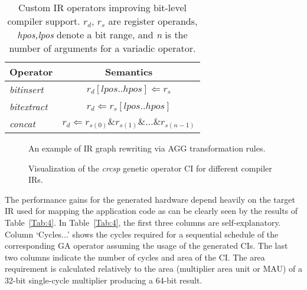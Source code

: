 \documentclass{comjnl}
\begin{document}
\begin{table}
  \renewcommand{\arraystretch}{0.95}
  \caption{Custom IR operators improving bit-level compiler support. $r_{d}$, $r_{s}$ are register operands, {\it hpos,lpos} denote a bit range, and {\it n} is the number of arguments for a variadic operator.} 
  \centering
  {\footnotesize
  \begin{tabular}{|l|c|}
    \hline
    \multicolumn{1}{|m{2.0cm}|}{\centering Operator}
    &\multicolumn{1}{m{5.0cm}|}{\centering Semantics}\\
    \hline
    {\it bitinsert} & $r_{d}[lpos..hpos] \Leftarrow r_{s}$ \\ 
    {\it bitextract} & $r_{d} \Leftarrow r_{s}[lpos..hpos]$ \\ 
    {\it concat} & $r_{d} \Leftarrow r_{s(0)} \& r_{s(1)} \& \ldots \& r_{s(n-1)}$ \\
    \hline
  \end{tabular}
  }
  \label{Tab:3}
  \vspace{-0.125cm}
\end{table}

\begin{figure}[tb]
  \centering
  \caption{An example of IR graph rewriting via AGG transformation rules.}
  \label{Fig:7}
  \vspace{-0.125cm}
\end{figure}

\begin{figure}[tb]
  \centering
  \caption{Visualization of the {\it crcsp} genetic operator CI for different compiler IRs.}
  \label{Fig:8}
  \vspace{-0.125cm}
\end{figure}

The performance gains for the generated hardware depend heavily on the target IR used for mapping the application code as can be clearly seen by the results of Table~\ref{Tab:4}. In Table~\ref{Tab:4}, the first three columns are self-explanatory. Column `Cycles...' shows the cycles required for a sequential schedule of the corresponding GA operator assuming the usage of the generated CIs. The last two columns indicate the number of cycles and area of the CI. The area requirement is calculated relatively to the area (multiplier area unit or MAU) of a 32-bit single-cycle multiplier producing a 64-bit result.
\end{document}
